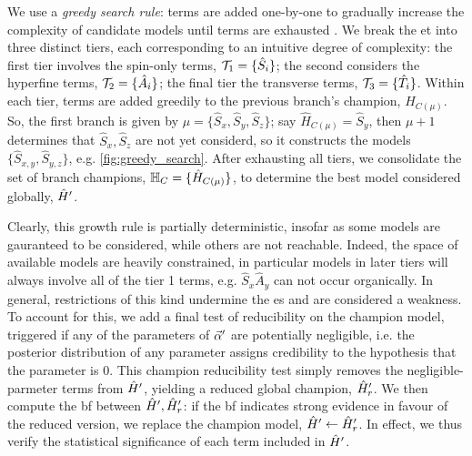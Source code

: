 We use a \emph{greedy search rule}: 
    terms are added one-by-one to gradually increase the complexity of candidate models until terms are exhausted \cite{russell2002artificial}.  
We break the \gls{et} into three distinct tiers, each corresponding to an intuitive degree of complexity:
    the first tier involves the spin-only terms, $\mathcal{T}_1 = \{ \hat{S}_i \}$; 
    the second considers the hyperfine terms, $\mathcal{T}_2 = \{ \hat{A}_i \}$;
    the final tier the transverse terms, $\mathcal{T}_3 = \{ \hat{T}_i\}$.  
Within each tier, terms are added greedily to the previous branch's champion, $\hat{H}_{C(\mu)}$.
So, the first branch is given by $\mu = \{ \hat{S}_x, \hat{S}_y, \hat{S}_z\}$;
    say $\hat{H}_{C(\mu)} = \hat{S}_y$, then $\mu + 1$  determines that $\hat{S}_x, \hat{S}_z$ 
    are not yet considerd, so it constructs the models $\{\hat{S}_{x,y}, \hat{S}_{y,z}\}$, e.g. \cref{fig:greedy_search}. 
After exhausting all tiers, we consolidate the set of branch champions, $\mathbb{H}_C = \{ \hat{H}_{C(\mu)}\}$, 
    to determine the best model considered globally, $\hat{H}^{\prime}$.  
\par 

Clearly, this growth rule is partially deterministic, insofar as some models are gauranteed to be considered, 
    while others are not reachable.
Indeed, the space of available models are heavily constrained, in particular models in later tiers will 
    always involve all of the tier 1 terms, e.g. $\hat{S}_{x}\hat{A}_{y}$ can not occur organically. 
In general, restrictions of this kind undermine the \gls{es} and are considered a weakness.
To account for this, we add a final test of reducibility on the \gls{champion model}, 
    triggered if any of the parameters of $\vec{\alpha}^{\prime}$ are potentially negligible, 
    i.e. the posterior distribution of any parameter assigns credibility to the hypothesis that the parameter is 0.
This champion reducibility test simply removes the negligible-parmeter terms from $\hat{H}^{\prime}$, 
    yielding a reduced global champion, $\hat{H}^{\prime}_r$.
We then compute the \gls{bf} between $\hat{H}^{\prime}, \hat{H}^{\prime}_r$: 
    if the \gls{bf} indicates strong evidence in favour of the reduced version, 
    we replace the \gls{champion model}, $\hat{H}^{\prime} \gets \hat{H}^{\prime}_r$. 
In effect, we thus verify the statistical significance of each term included in $\hat{H}^{\prime}$. 
\par 

